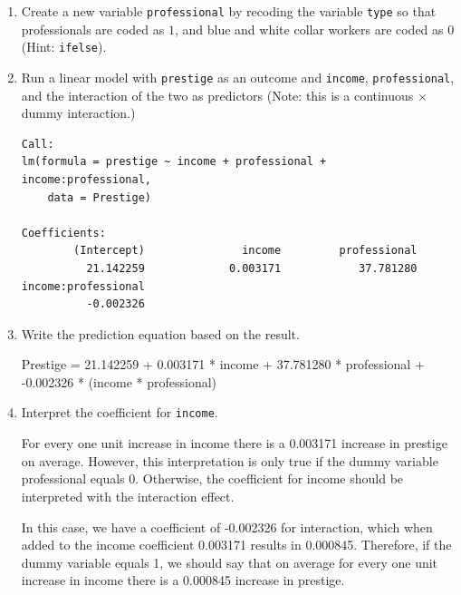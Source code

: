 \documentclass[12pt,letterpaper]{article}
\begin{document}
\newpage
\begin{enumerate}
	
	\item [(a)]
	Create a new variable \texttt{professional} by recoding the variable \texttt{type} so that professionals are coded as $1$, and blue and white collar workers are coded as $0$ (Hint: \texttt{ifelse}).

	\vspace{.5cm}

	
	
	\item [(b)]
	Run a linear model with \texttt{prestige} as an outcome and \texttt{income}, \texttt{professional}, and the interaction of the two as predictors (Note: this is a continuous $\times$ dummy interaction.)

	\vspace{.5cm}

	
	\begin{verbatim}
Call:
lm(formula = prestige ~ income + professional + income:professional, 
	data = Prestige)
		
Coefficients:
		(Intercept)               income         professional  
		  21.142259             0.003171            37.781280  
income:professional  
	      -0.002326
	\end{verbatim}
	
	\item [(c)]
	Write the prediction equation based on the result.

	\vspace{.5cm}

	\noindent Prestige = 21.142259 + 0.003171 * income + 37.781280  * professional + -0.002326 * (income * professional)
	
	\item [(d)]
	Interpret the coefficient for \texttt{income}.

	\vspace{.5cm}

	\noindent For every one unit increase in income there is a 0.003171 increase in prestige on average. However, this interpretation is only true if the dummy variable professional equals 0. Otherwise, the coefficient for income should be interpreted with the interaction effect.

	In this case, we have a coefficient of -0.002326 for interaction, which when added to the income coefficient 0.003171 results in 0.000845. Therefore, if the dummy variable equals 1, we should say that on average for every one unit increase in income there is a 0.000845 increase in prestige.
	

\end{enumerate}
\end{document}
